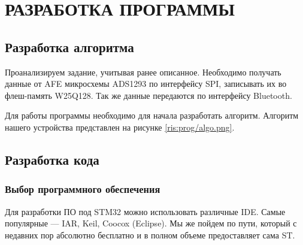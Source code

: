 \begin{sloppypar} %
\newpage %
\section{РАЗРАБОТКА ПРОГРАММЫ} %
\subsection{Разработка алгоритма}

Проанализируем задание, учитывая ранее описанное. Необходимо получать данные от \ac{AFE} микросхемы ADS1293 по интерфейсу SPI, записывать их во флеш-память W25Q128. Так же данные передаются по интерфейсу Bluetooth.


Для работы программы необходимо для начала разработать алгоритм. Алгоритм нашего устройства представлен на рисунке \ref{ris:prog/algo.png}.










\subsection{Разработка кода}

\subsubsection{Выбор программного обеспечения}
Для разработки ПО под STM32 можно использовать различные IDE. Самые популярные — IAR, Keil, Coocox (Eclipse). Мы же пойдем по пути, который с недавних пор абсолютно бесплатно и в полном объеме предоставляет сама ST.



\end{sloppypar}

